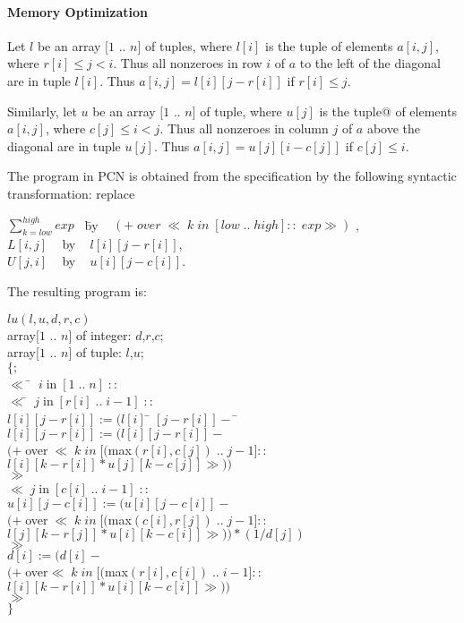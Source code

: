 \paragraph{Memory Optimization}

Let $l$ be an array $[1$ .. $n]$ of tuples, where
 $l[i]$ is the tuple of elements $a[i,j]$, where $r[i] \leq j < i$.
Thus all nonzeroes in row $i$ of $a$ to the left of the diagonal are in
tuple $l[i]$.
Thus $a[i,j] = l[i][j-r[i]]$ if $r[i] \leq j$.

Similarly, let $u$ be an array $[1$ .. $n]$ of tuple, 
where $u[j]$ is the tuple@ of elements $a[i,j]$, where $c[j] \leq i < j$.
Thus all nonzeroes in column $j$ of $a$ above the diagonal are in
tuple $u[j]$.
Thus $a[i,j] = u[j][i-c[j]]$ if $c[j] \leq i$.


The program in PCN is obtained from the specification 
by the following syntactic transformation: replace 
\begin{tabbing} 
$\sum_{k=low}^{high} exp \; \; \; $\= by $\; \; \; 
(+ \; over \; \ll \; k \; in \; [low \; .. \; high] :: \; exp \gg ) $ , \\
$L[i,j]  \; \; \; $\> by $\; \; \;  l[i][j-r[i]]$, \\
$U[j,i]  \; \; \; $\> by $\; \; \;  u[i][j-c[i]]$. \\
\end{tabbing}
The resulting program is:

\begin{tabbing}
$lu(l,u,d,r,c)$ \\
array$[1$ .. $n]$ of integer: $d$,$r$,$c$; \\
array$[1$ .. $n]$ of tuple: $l$,$u$; \\
$\{;$ \\
$\ll $ \= $\; i \;   $in$ \; [1 \; .. \; n] \; :: $\\
\>$ \ll $\= $ \; j \; $in$ \; [r[i] \; .. \; i-1] \; ::$ \\
\> \>$ l[i][j-r[i]] :=  (l[i]$ \= $[j-r[i]] - $ \=  \kill
\> \>$ l[i][j-r[i]] :=  (l[i][j-r[i]] - $ \\
\> \> \> $(+ \; $over$ \; \ll \; k \; in \; 
[($max$(r[i],c[j]) \; .. \; j-1] ::$ \\
\> \> \> $l[i][k-r[i]]*u[j][k-c[j]] \gg ))$\\
\>$ \gg$ \\
\> $\ll $\>$ \; j \;  $in$ \; [c[i] \; .. \; i-1] \; :: $\\
\> \> $u[i][j-c[i]] :=  (u[i][j-c[i]] - $\\
\> \> \> $(+ \;$over$ \; \ll \; k \; in \; 
[($max$(c[i],r[j]) \; .. \; j-1] :: $\\
\> \> \> $l[j][k-r[j]]*u[i][k-c[i]] \gg )) * (1/d[j])$ \\
\> $\gg$ \\
\> \> $d[i] := (d[i] - $\\
\> \> \> $( + \; $over$ \ll \; k \; in \; 
[($max$(r[i],c[i]) \; .. \; i-1] :: $ \\
\> \> \> $l[i][k-r[i]]*u[i][k-c[i]] \gg ))$ \\
$\gg$ \\
$\}$
\end{tabbing}

